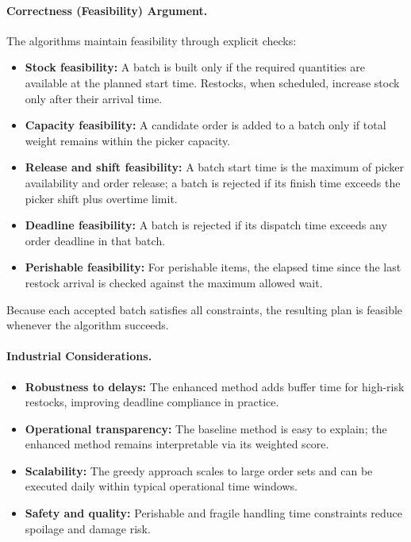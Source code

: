 \documentclass[11pt]{article}
\begin{document}
\paragraph{Correctness (Feasibility) Argument.}
The algorithms maintain feasibility through explicit checks:
\begin{itemize}[leftmargin=1.25em]
    \item \textbf{Stock feasibility:} A batch is built only if the required quantities are available at the planned start time. Restocks, when scheduled, increase stock only after their arrival time.
    \item \textbf{Capacity feasibility:} A candidate order is added to a batch only if total weight remains within the picker capacity.
    \item \textbf{Release and shift feasibility:} A batch start time is the maximum of picker availability and order release; a batch is rejected if its finish time exceeds the picker shift plus overtime limit.
    \item \textbf{Deadline feasibility:} A batch is rejected if its dispatch time exceeds any order deadline in that batch.
    \item \textbf{Perishable feasibility:} For perishable items, the elapsed time since the last restock arrival is checked against the maximum allowed wait.
\end{itemize}
Because each accepted batch satisfies all constraints, the resulting plan is feasible whenever the algorithm succeeds.

\paragraph{Industrial Considerations.}
\begin{itemize}[leftmargin=1.25em]
    \item \textbf{Robustness to delays:} The enhanced method adds buffer time for high-risk restocks, improving deadline compliance in practice.
    \item \textbf{Operational transparency:} The baseline method is easy to explain; the enhanced method remains interpretable via its weighted score.
    \item \textbf{Scalability:} The greedy approach scales to large order sets and can be executed daily within typical operational time windows.
    \item \textbf{Safety and quality:} Perishable and fragile handling time constraints reduce spoilage and damage risk.
\end{itemize}
\end{document}
